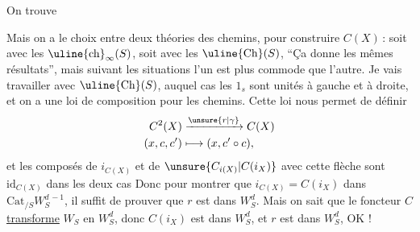 On trouve 

Mais on a le choix entre deux théories des chemins, pour construire $C(X)$\,: soit avec les $\text{\uline{ch}}_{\infty}(S)$, soit avec les $\text{\uline{Ch}}(S)$, ``Ça donne les mêmes résultats'', mais suivant les situations l'un est plus commode que l'autre. Je vais travailler avec  $\text{\uline{Ch}}(S)$, auquel cas les $1_s$ sont  unités à gauche et à droite,  et on a une loi de composition pour les chemins. Cette loi nous permet de définir
\[
 \begin{aligned}
 C^2(X)&\xrightarrow{\unsure{r|\gamma}}C(X)\\
 (x,c,c')&\longmapsto(x,c'\circ c),
 \end{aligned}
\]
et les composés de $i_{C(X)}$ et de $\unsure{C_{i(X)}|C(i_X)}$ avec cette flèche sont $\mathrm{id}_{C(X)}$ dans les deux cas
Donc pour montrer que $i_{C(X)}=C(i_X)$ dans $\mathrm{Cat}_{/S}W_S^{d\, -1}$, il suffit de prouver que $r$ est dans $W_S^d$. Mais on sait que le foncteur $C$ \uline{transforme} $W_S$ en $W_S^d$, donc $C(i_X)$ est dans $W_S^d$, et   $r$ est dans $W_S^d$, OK !
